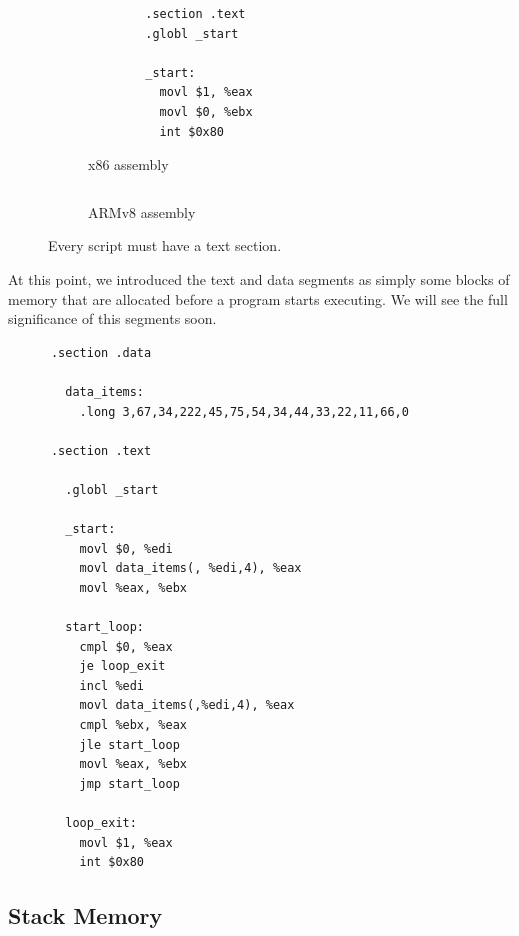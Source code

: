   \begin{figure}[H]
    \centering
    \begin{subfigure}[b]{0.48\textwidth}
      \centering
      \begin{lstlisting}
        .section .text
        .globl _start

        _start:
          movl $1, %eax 
          movl $0, %ebx 
          int $0x80  
      \end{lstlisting}
      \caption{x86 assembly}
    \end{subfigure}
    \hfill 
    \begin{subfigure}[b]{0.48\textwidth}
      \centering
      \begin{lstlisting}
      \end{lstlisting}
      \caption{ARMv8 assembly}
    \end{subfigure}
    \caption{Every script must have a text section.}
  \end{figure}

  At this point, we introduced the text and data segments as simply some blocks of memory that are allocated before a program starts executing. We will see the full significance of this segments soon. 

  \begin{example}
    \label{ex:maximum-of-array-of-integers}
    \begin{lstlisting}
      .section .data

        data_items: 
          .long 3,67,34,222,45,75,54,34,44,33,22,11,66,0

      .section .text

        .globl _start

        _start:
          movl $0, %edi
          movl data_items(, %edi,4), %eax
          movl %eax, %ebx

        start_loop: 
          cmpl $0, %eax 
          je loop_exit 
          incl %edi 
          movl data_items(,%edi,4), %eax 
          cmpl %ebx, %eax
          jle start_loop 
          movl %eax, %ebx
          jmp start_loop 

        loop_exit: 
          movl $1, %eax 
          int $0x80 
    \end{lstlisting}
  \end{example}

\subsection{Stack Memory} 

